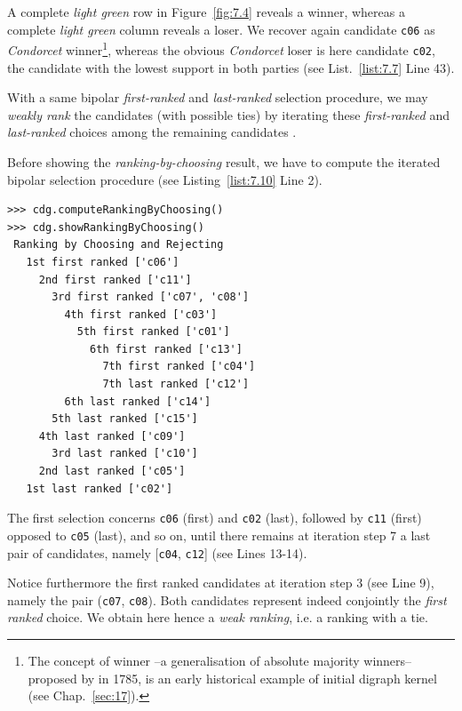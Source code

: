 A complete \emph{light green} row in Figure~\vref{fig:7.4} reveals a \Condorcet winner, whereas a complete \emph{light green} column reveals a \Condorcet loser. We recover again candidate \texttt{c06} as \emph{Condorcet} winner\footnote{The concept of \Condorcet winner --a generalisation of absolute majority winners-- proposed by \Condorcet in 1785, is an early historical example of initial digraph kernel (see Chap.~\ref{sec:17}).}, whereas the obvious \emph{Condorcet} loser is here candidate \texttt{c02}, the candidate with the lowest support in both parties (see List.~\vref{list:7.7} Line 43).

With a same bipolar \emph{first-ranked} and \emph{last-ranked} selection procedure, we may \emph{weakly rank} the candidates (with possible ties) by iterating these \emph{first-ranked} and \emph{last-ranked} choices among the remaining candidates \citep{BIS-1999}.

Before showing the \emph{ranking-by-choosing} result, we have to compute the iterated bipolar selection procedure (see Listing~\vref{list:7.10} Line 2).
\begin{lstlisting}[caption={Ranking by iterating choosing the \emph{first} and \emph{last} remaining candidates },label=list:7.10]
>>> cdg.computeRankingByChoosing()
>>> cdg.showRankingByChoosing()
 Ranking by Choosing and Rejecting
   1st first ranked ['c06']
     2nd first ranked ['c11']
       3rd first ranked ['c07', 'c08']
         4th first ranked ['c03']
           5th first ranked ['c01']
             6th first ranked ['c13']
               7th first ranked ['c04']
               7th last ranked ['c12']
	     6th last ranked ['c14']
	   5th last ranked ['c15']
	 4th last ranked ['c09']
       3rd last ranked ['c10']
     2nd last ranked ['c05']
   1st last ranked ['c02']
\end{lstlisting}
The first selection concerns \texttt{c06} (first) and \texttt{c02} (last), followed by \texttt{c11} (first) opposed to \texttt{c05} (last), and so on, until there remains at iteration step 7 a last pair of candidates, namely [\texttt{c04}, \texttt{c12}] (see Lines 13-14).

Notice furthermore the first ranked candidates at iteration step 3 (see Line 9), namely the pair (\texttt{c07}, \texttt{c08}). Both candidates represent indeed conjointly the \emph{first ranked} choice. We obtain here hence a \emph{weak ranking}, i.e. a ranking with a tie.

